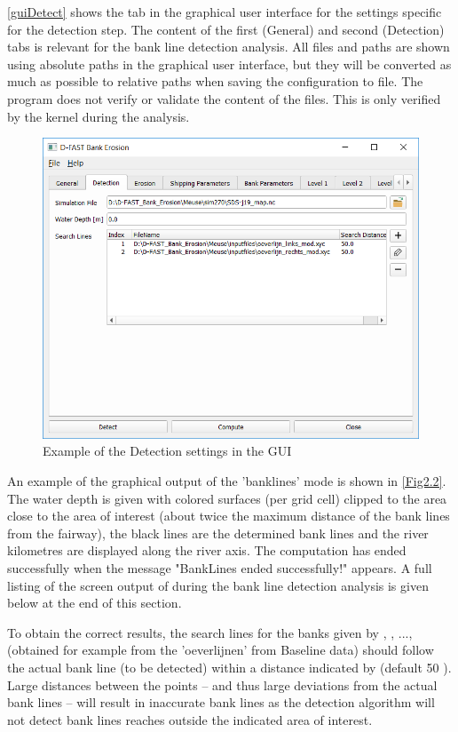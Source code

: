 \autoref{guiDetect} shows the tab in the graphical user interface for the settings specific for the detection step.
The content of the first (General) and second (Detection) tabs is relevant for the bank line detection analysis.
All files and paths are shown using absolute paths in the graphical user interface, but they will be converted as much as possible to relative paths when saving the configuration to file.
The program does not verify or validate the content of the files.
This is only verified by the kernel during the analysis.

\begin{figure}
\center
\includegraphics[width=\textwidth]{figures/gui2.png}
\caption{Example of the Detection settings in the GUI}
\label{guiDetect}
\end{figure}

An example of the graphical output of the 'banklines' mode is shown in \autoref{Fig2.2}.
The water depth is given with colored surfaces (per grid cell) clipped to the area close to the area of interest (about twice the maximum distance of the bank lines from the fairway), the black lines are the determined bank lines and the river kilometres are displayed along the river axis.
The computation has ended successfully when the message "BankLines ended successfully!" appears.
A full listing of the screen output of \dfastbe during the bank line detection analysis is given below at the end of this section.

\Note To obtain the correct results, the search lines for the banks given by , , ...,  (obtained for example from the 'oeverlijnen' from Baseline data) should follow the actual bank line (to be detected) within a distance indicated by  (default 50 ).
Large distances between the points -- and thus large deviations from the actual bank lines -- will result in inaccurate bank lines as the detection algorithm will not detect bank lines reaches outside the indicated area of interest.

